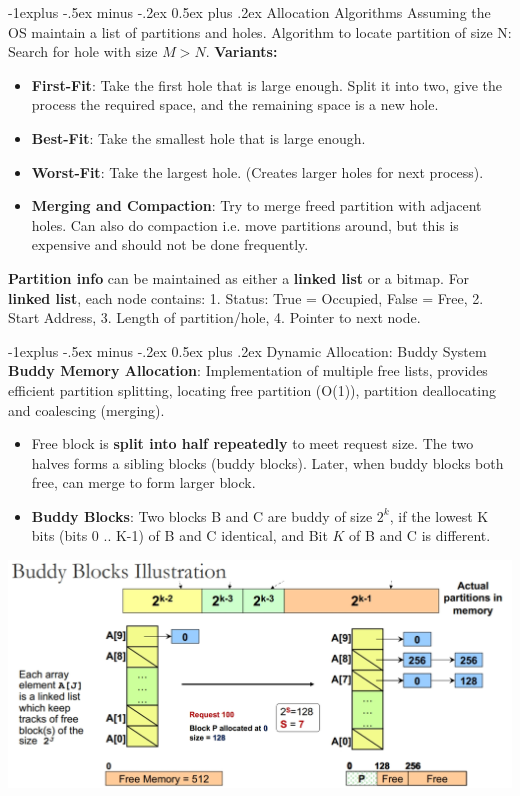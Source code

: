 \documentclass[10pt, landscape]{article}
\makeatletter
\renewcommand{\subsection}{\@startsection{subsection}{2}{0mm}%
                                {-1explus -.5ex minus -.2ex}%
                                {0.5ex plus .2ex}%
                                {\normalfont\normalsize\bfseries}}
\makeatother
\begin{document}
\begin{multicols*}{3}
\subsection{Allocation Algorithms}
Assuming the OS maintain a list of partitions and holes. Algorithm to locate partition of size N: Search for hole with size $M > N$. \textbf{Variants:}
\begin{itemize}
\item \textbf{First-Fit}: Take the first hole that is large enough. Split it into two, give the process the required space, and the remaining space is a new hole.
\item \textbf{Best-Fit}: Take the smallest hole that is large enough.
\item \textbf{Worst-Fit}: Take the largest hole. (Creates larger holes for next process).
\item \textbf{Merging and Compaction}: Try to merge freed partition with adjacent holes. Can also do compaction i.e. move partitions around,
but this is expensive and should not be done frequently.
\end{itemize}
\textbf{Partition info} can be maintained as either a \textbf{linked list} or a bitmap. For \textbf{linked list}, each node contains: 1. Status: True = Occupied, False = Free, 2. Start Address, 3. Length of partition/hole, 4. Pointer to next node.


\subsection{Dynamic Allocation: Buddy System}
\textbf{Buddy Memory Allocation}: Implementation of multiple free lists, provides efficient partition splitting, locating free partition (O(1)), partition deallocating and coalescing (merging).
\begin{itemize}
\item Free block is \textbf{split into half repeatedly} to meet request size. The two halves forms a sibling blocks (buddy blocks). Later, when buddy blocks both free, can merge to form larger block.
\item \textbf{Buddy Blocks}: Two blocks B and C are buddy of size $2^k$, if the lowest K bits (bits 0 .. K-1) of B and C identical, and Bit $K$ of B and C is different.
\end{itemize}
\centerline{\includegraphics[width=0.8\linewidth]{buddyBlocks}}


\end{multicols*}
\end{document}
